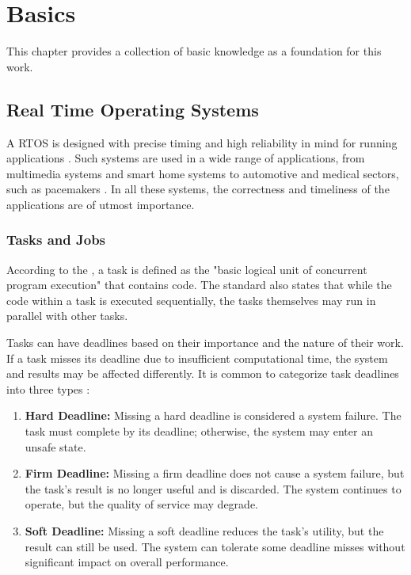 \chapter{Basics}
This chapter provides a collection of basic knowledge as a foundation for this work.

\section{Real Time Operating Systems}\label{sec:rtos}
A \ac{RTOS} is designed with precise timing and high reliability in mind for running applications \textcite{stankovicRealtimeOperatingSystems2004}.
Such systems are used in a wide range of applications, from multimedia systems and smart home systems to automotive and medical sectors, such as pacemakers \cite{hambardeSurveyRealTime2014}.
In all these systems, the correctness and timeliness of the applications are of utmost importance\cite{hambardeSurveyRealTime2014}.

\subsection{Tasks and Jobs}\label{sec:tasks_and_jobs}
According to the \textcite{IEEEStandardRealTime}, a task is defined as the "basic logical unit of concurrent program execution" that contains code. The standard also states that while the code within a task is executed sequentially, the tasks themselves may run in parallel with other tasks.

Tasks can have deadlines based on their importance and the nature of their work. If a task misses its deadline due to insufficient computational time, the system and results may be affected differently. It is common to categorize task deadlines into three types \cite{dengSchedulingRealtimeApplications1997,abeniIntegratingMultimediaApplications1998,shindeComparisonRealTime2017}:
\begin{enumerate}
	\item \textbf{Hard Deadline:}
	      Missing a hard deadline is considered a system failure. The task must complete by its deadline; otherwise, the system may enter an unsafe state.
	\item \textbf{Firm Deadline:}
	      Missing a firm deadline does not cause a system failure, but the task's result is no longer useful and is discarded. The system continues to operate, but the quality of service may degrade.
	\item \textbf{Soft Deadline:}
	      Missing a soft deadline reduces the task's utility, but the result can still be used. The system can tolerate some deadline misses without significant impact on overall performance.
\end{enumerate}


